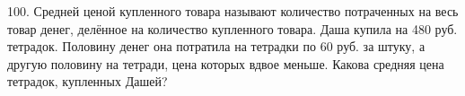 100. Средней ценой купленного товара называют количество потраченных на весь товар денег, делённое на количество купленного товара. Даша купила на 480 руб. тетрадок. Половину денег она потратила на тетрадки по 60 руб. за штуку, а другую половину на тетради, цена которых вдвое меньше. Какова средняя цена тетрадок, купленных Дашей?\\
